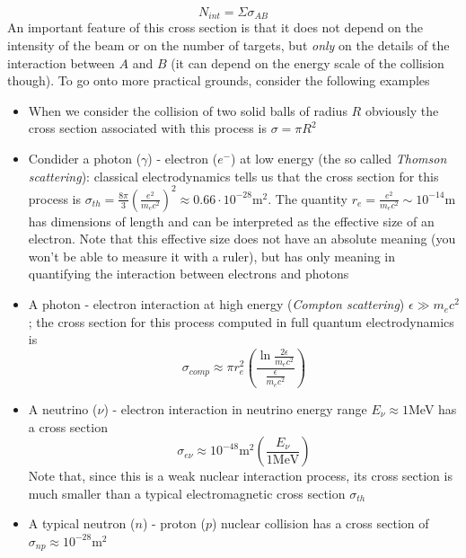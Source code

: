 \documentclass[11pt, a4paper,oneside,openright]{book}
\numberwithin{equation}{section}
\begin{document}
\begin{equation}
N_{int}=\Sigma \sigma_{AB}
\end{equation}
An important feature of this cross section is that it does not depend on the intensity of the beam or on the number of targets, but \textit{only} on the details of the interaction between $A$ and $B$ (it can depend on the energy scale of the collision though). To go onto more practical grounds, consider the following examples
\begin{itemize}
\item When we consider the collision of two solid balls of radius $R$ obviously the cross section associated with this process is $\sigma=\pi R^2$
\item Condider a photon ($\gamma$) - electron ($e^-$) at low energy (the so called \textit{Thomson scattering}): classical electrodynamics tells us that the cross section for this process is $\sigma_{th}=\frac{8\pi}{3}\left(\frac{e^2}{m_ec^2}\right)^2\approx0.66\cdot 10^{-28}\mathrm{m}^2$. The quantity $r_e=\frac{e^2}{m_ec^2}\sim 10^{-14}$m has dimensions of length and can be interpreted as the effective size of an electron. Note that this effective size does not have an absolute meaning (you won't be able to measure it with a ruler), but has only meaning in quantifying the interaction between electrons and photons
\item A photon - electron interaction at high energy (\textit{Compton scattering}) $\epsilon \gg m_ec^2$; the cross section for this process computed in full quantum electrodynamics is 
\begin{equation}
\sigma_{comp}\approx \pi r_e^2\left(\frac{\ln{\frac{2\epsilon}{m_ec^2}}}{\frac{\epsilon}{m_ec^2}}\right)
\end{equation} 
\item A neutrino ($\nu$) - electron interaction in neutrino energy range $E_\nu\approx 1$MeV has a cross section 
\begin{equation}
\label{neutel}
\sigma_{e\nu}\approx 10^{-48}\mathrm{m}^2\left(\frac{E_\nu}{1\mathrm{MeV}}\right)
\end{equation}
Note that, since this is a weak nuclear interaction process, its cross section is much smaller than a typical electromagnetic cross section $\sigma_{th}$
\item A typical neutron ($n$) - proton ($p$) nuclear collision has a cross section of $\sigma_{np}\approx 10^{-28}$m$^2$ 
\end{itemize} 
\end{document}
